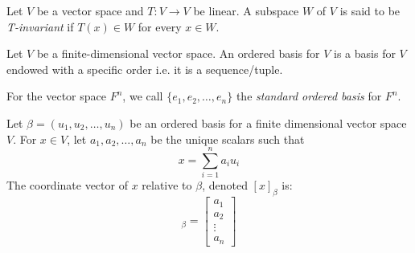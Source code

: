 \documentclass[nobib,notoc]{tufte-handout}
\begin{document}
\begin{defi}[T-Invariant]
	Let \(V\) be a vector space and \(T:V\rightarrow V\) be linear. A subspace \(W\) of \(V\) is said to be \emph{T-invariant} if \(T(x)\in W\) for every \(x\in W\).
\end{defi}
\begin{defi}
	Let \(V\) be a finite-dimensional vector space. An ordered basis for \(V\) is a basis for \(V\) endowed with a specific order i.e. it is a sequence/tuple.
\end{defi}
\begin{defi}
	For the vector space \(F^n\), we call \(\{e_1,e_2,\ldots,e_n\}\) the \emph{standard ordered basis} for \(F^n\).
\end{defi}
\begin{defi}
	Let \(\beta=(u_1,u_2,\ldots,u_n)\) be an ordered basis for a finite dimensional vector space \(V\). For \(x\in V\), let \(a_1,a_2,\ldots,a_n\) be the unique scalars such that
	\begin{equation*}
		x=\sum_{i=1}^{n}a_iu_i
	\end{equation*}
	The coordinate vector of \(x\) relative to \(\beta\), denoted \([x]_{\beta}\) is:
	\begin{equation*}
		[x]_{\beta}=\begin{bmatrix}a_1\\a_2\\\vdots\\a_n\end{bmatrix}
	\end{equation*}
\end{defi}
\end{document}
